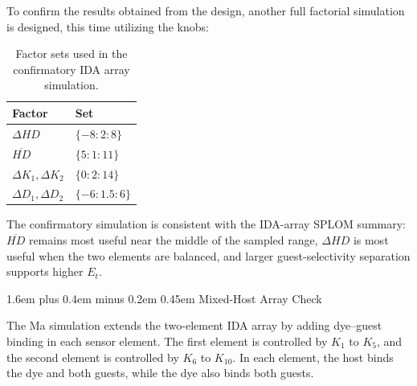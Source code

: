 \documentclass[11pt]{article}
\makeatletter
\newcommand{\Et}{E_t}
\renewcommand\section{\@startsection{section}{1}{0pt}%
    {1.6em plus 0.4em minus 0.2em}%
    {0.45em}%
    {\normalfont\Large\bfseries\color{reportblue}}}
\makeatother
\begin{document}
To confirm the results obtained from the design, another full factorial
simulation is designed, this time utilizing the knobs:
\begin{table}[H]
\centering
\caption{Factor sets used in the confirmatory IDA array simulation.}
\label{tab:confirmatory_knobs}
\renewcommand{\arraystretch}{1.15}
\begin{tabular}{ll}
\toprule
Factor & Set \\
\midrule
$\Delta HD$ & $\{-8:2:8\}$ \\
$\overline{HD}$ & $\{5:1:11\}$ \\
$\Delta K_1,\Delta K_2$ & $\{0:2:14\}$ \\
$\Delta D_1,\Delta D_2$ & $\{-6:1.5:6\}$ \\
\bottomrule
\end{tabular}
\end{table}

The confirmatory simulation is consistent with the IDA-array SPLOM summary:
$\overline{HD}$ remains most useful near the middle of the sampled range,
$\Delta HD$ is most useful when the two elements are balanced, and larger
guest-selectivity separation supports higher $\Et$.

\section{Mixed-Host Array Check}

The Ma simulation extends the two-element IDA array by adding dye--guest binding
in each sensor element. The first element is controlled by $K_1$ to $K_5$, and
the second element is controlled by $K_6$ to $K_{10}$. In each element, the host
binds the dye and both guests, while the dye also binds both guests.
\end{document}
